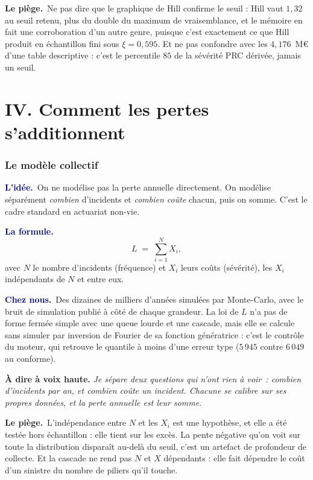 \documentclass[11pt,a4paper]{article}
\newcommand{\lidee}[1]{\smallskip\noindent\textcolor{navy}{\textbf{L'idée.}}\ #1\par}
\newcommand{\laformule}[1]{\smallskip\noindent\textcolor{navy}{\textbf{La formule.}}\ #1\par}
\newcommand{\cheznous}[1]{\smallskip\noindent\textcolor{navy}{\textbf{Chez nous.}}\ #1\par}
\newcommand{\lepiege}[1]{\smallskip\noindent\textcolor{accent}{\textbf{Le piège.}}\ #1\par}
\newcommand{\laphrase}[1]{\begin{phrasebox}\textbf{À dire à voix haute.} \emph{#1}\end{phrasebox}}
\begin{document}
\lepiege{Ne pas dire que le graphique de Hill confirme le seuil : Hill vaut $1{,}32$ au seuil
retenu, plus du double du maximum de vraisemblance, et le mémoire en fait une corroboration d'un
autre genre, puisque c'est exactement ce que Hill produit en échantillon fini sous $\xi=0{,}595$.
Et ne pas confondre avec les $4{,}176$~M\euro{} d'une table descriptive : c'est le percentile $85$
de la sévérité PRC dérivée, jamais un seuil.}

\part*{IV. Comment les pertes s'additionnent}

\section{Le modèle collectif}

\lidee{On ne modélise pas la perte annuelle directement. On modélise séparément
\emph{combien} d'incidents et \emph{combien coûte} chacun, puis on somme. C'est le cadre
standard en actuariat non-vie.}

\laformule{
\[
  L \;=\; \sum_{i=1}^{N} X_i,
\]
avec $N$ le nombre d'incidents (fréquence) et $X_i$ leurs coûts (sévérité), les $X_i$
indépendants de $N$ et entre eux.}

\cheznous{Des dizaines de milliers d'années simulées par Monte-Carlo, avec le bruit de simulation
publié à côté de chaque grandeur. La loi de $L$ n'a pas de forme fermée simple avec une queue
lourde et une cascade, mais elle se calcule sans simuler par inversion de Fourier de sa fonction
génératrice : c'est le contrôle du moteur, qui retrouve le quantile à moins d'une erreur type
($5\,945$ contre $6\,049$ au conforme).}

\laphrase{Je sépare deux questions qui n'ont rien à voir~: combien d'incidents par an, et
combien coûte un incident. Chacune se calibre sur ses propres données, et la perte annuelle
est leur somme.}

\lepiege{L'indépendance entre $N$ et les $X_i$ est une hypothèse, et elle a été testée hors
échantillon : elle tient sur les excès. La pente négative qu'on voit sur toute la distribution
disparaît au-delà du seuil, c'est un artefact de profondeur de collecte. Et la cascade ne rend pas
$N$ et $X$ dépendants : elle fait dépendre le coût d'un sinistre du nombre de piliers qu'il
touche.}
\end{document}

